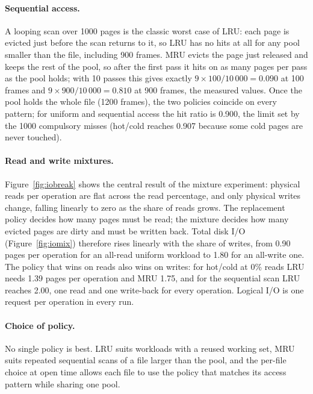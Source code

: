 \documentclass[11pt,a4paper]{article}
\begin{document}
\paragraph{Sequential access.} A looping scan over 1000 pages is the classic worst case of LRU: each page is evicted just before the scan returns to it, so LRU has no hits at all for any pool smaller than the file, including 900 frames. MRU evicts the page just released and keeps the rest of the pool, so after the first pass it hits on as many pages per pass as the pool holds; with 10 passes this gives exactly \(9 \times 100 / 10\,000 = 0.090\) at 100 frames and \(9 \times 900 / 10\,000 = 0.810\) at 900 frames, the measured values. Once the pool holds the whole file (1200 frames), the two policies coincide on every pattern; for uniform and sequential access the hit ratio is 0.900, the limit set by the 1000 compulsory misses (hot/cold reaches 0.907 because some cold pages are never touched).

\paragraph{Read and write mixtures.} Figure~\ref{fig:iobreak} shows the central result of the mixture experiment: physical reads per operation are flat across the read percentage, and only physical writes change, falling linearly to zero as the share of reads grows. The replacement policy decides how many pages must be read; the mixture decides how many evicted pages are dirty and must be written back. Total disk I/O (Figure~\ref{fig:iomix}) therefore rises linearly with the share of writes, from 0.90 pages per operation for an all-read uniform workload to 1.80 for an all-write one. The policy that wins on reads also wins on writes: for hot/cold at 0\% reads LRU needs 1.39 pages per operation and MRU 1.75, and for the sequential scan LRU reaches 2.00, one read and one write-back for every operation. Logical I/O is one request per operation in every run.

\paragraph{Choice of policy.} No single policy is best. LRU suits workloads with a reused working set, MRU suits repeated sequential scans of a file larger than the pool, and the per-file choice at open time allows each file to use the policy that matches its access pattern while sharing one pool.

\end{document}
